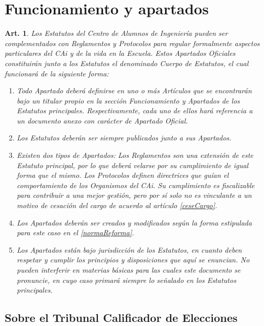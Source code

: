 \documentclass[letterpaper,11pt]{article}
\theoremstyle{plain}
\newtheorem{art}{Art.} %
\newcommand{\aref}[1]{\hyperref[#1]{\ref*{#1}}}
\begin{document}
	\section{Funcionamiento y apartados}

		\begin{art}\label{definicionApartados}
			Los Estatutos del Centro de Alumnos de Ingeniería pueden ser complementados con Reglamentos y Protocolos para regular formalmente aspectos particulares del CAi y de la vida en la Escuela. Estos Apartados Oficiales constituirán junto a los Estatutos el denominado Cuerpo de Estatutos, el cual funcionará de la siguiente forma:
			\begin{enumerate}
				\item Todo Apartado deberá definirse en uno o más Artículos que se encontrarán bajo un titular propio en la sección Funcionamiento y Apartados de los Estatutos principales. Respectivamente, cada uno de ellos hará referencia a un documento anexo con carácter de Apartado Oficial.
				\item Los Estatutos deberán ser siempre publicados junto a sus Apartados.
				\item Existen dos tipos de Apartados: Los Reglamentos son una extensión de este Estatuto principal, por lo que deberá velarse por su cumplimiento de igual forma que el mismo. Los Protocolos definen directrices que guían el comportamiento de los Organismos del CAi. Su cumplimiento es fiscalizable para contribuir a una mejor gestión, pero por sí solo no es vinculante a un motivo de cesación del cargo de acuerdo al artículo \aref{ceseCargo}.
				\item Los Apartados deberán ser creados y modificados según la forma estipulada para este caso en el \aref{normaReforma}.
				\item Los Apartados están bajo jurisdicción de los Estatutos, en cuanto deben respetar y cumplir los principios y disposiciones que aquí se enuncian. No pueden interferir en materias básicas para las cuales este documento se pronuncie, en cuyo caso primará siempre lo señalado en los Estatutos principales.
			\end{enumerate}
		\end{art}

		\subsection*{Sobre el Tribunal Calificador de Elecciones}
\end{document}
